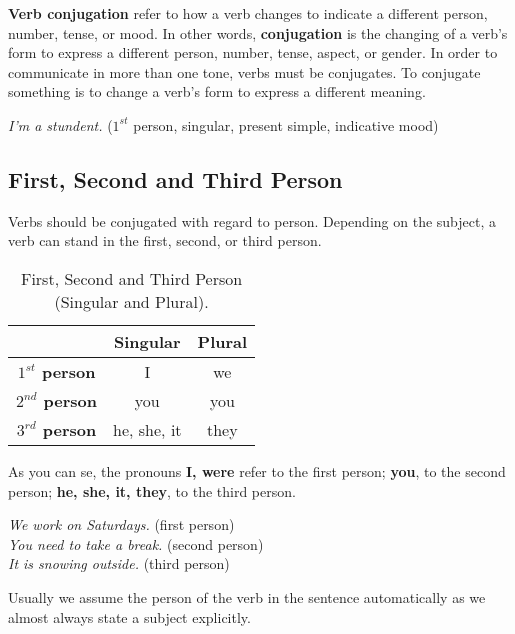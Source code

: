\documentclass[hidelinks,10pt,a4paper]{article}
\begin{document}
\textbf{Verb conjugation} refer to how a verb changes to indicate a different person, number, tense, or mood. In other words, \textbf{conjugation} is the changing of a verb's form to express a different person, number, tense, aspect, or gender. In order to communicate in more than one tone, verbs must be conjugates. To conjugate something is to change a verb's form to express a different meaning.

\begin{center}
	\textit{I'm a stundent.} ($1^{st}$ person, singular, present simple, indicative mood)
\end{center}

\subsection{First, Second and Third Person}
Verbs should be conjugated with regard to person. Depending on the subject, a verb can stand in the first, second, or third person.

\begin{table}[h]
	\begin{center}
	\begin{tabular}{|c|c|c|}
		\hline
		  & \textbf{Singular} & \textbf{Plural} \\ \hline
		\textbf{$1^{st}$ person} & I & we \\ \hline
		\textbf{$2^{nd}$ person} & you & you \\ \hline
		\textbf{$3^{rd}$ person} & he, she, it & they \\ \hline
	\end{tabular}
\end{center}
	\caption{\label{tab:vrbcjg1}First, Second and Third Person (Singular and Plural).}
\end{table}

\newpage
As you can se, the pronouns \textbf{I, were} refer to the first person; \textbf{you}, to the second person; \textbf{he, she, it, they}, to the third person.

\begin{center}
	\textit{We work on Saturdays.} (first person) \\
	\textit{You need to take a break.} (second person) \\
	\textit{It is snowing outside.} (third person)
\end{center}

Usually we assume the person of the verb in the sentence automatically as we almost always state a subject explicitly.
\end{document}
